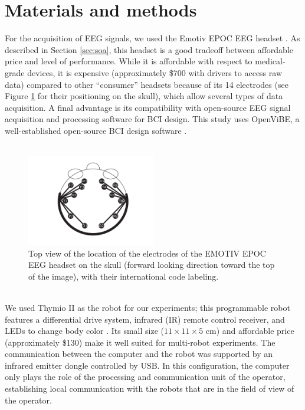 \documentclass[smallextended]{svjour3}
\begin{document}
\section{Materials and methods}
\label{sec:methods}
For the acquisition of EEG signals, we used the Emotiv EPOC EEG headset \cite{stytsenko2011evaluation}. 
As described in Section \ref{sec:soa}, this headset is a good tradeoff between affordable price and level of performance. 
While it is affordable with respect to medical-grade devices, it is expensive (approximately \$700 with drivers to access raw data) compared to other ``consumer'' headsets because of its 14 electrodes (see Figure \ref{fig:electrodes} for their positioning on the skull), which allow several types of data acquisition. 
A final advantage is its compatibility with open-source EEG signal acquisition and processing software for BCI design. This study uses OpenViBE, a well-established open-source BCI design software \cite{ov_publication}.\\
\\
\begin{figure}
\center
\includegraphics[width=0.5\textwidth]{figures/emotiv-electrodes.pdf}
\caption{Top view of the location of the electrodes of the EMOTIV EPOC EEG headset on the skull (forward looking direction toward the top of the image), with their international code labeling.} \label{fig:electrodes}
\end{figure}
\\
We used Thymio II as the robot for our experiments; this programmable robot features a differential drive system, infrared (IR) remote control receiver, and LEDs to change body color \cite{Riedo-et-al-2013}. Its small size ($11 \times 11 \times 5$ cm) and affordable price (approximately \$130) make it well suited for multi-robot experiments. 
The communication between the computer and the robot was supported by an infrared emitter dongle controlled by USB. 
In this configuration, the computer only plays the role of the processing and communication unit of the operator, establishing local communication with the robots that are in the field of view of the operator.\\
\end{document}
